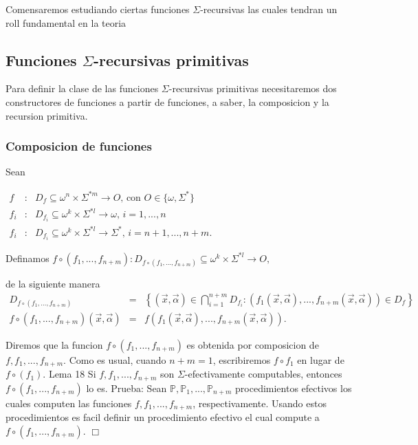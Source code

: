 Comensaremos estudiando ciertas funciones \(\Sigma \)-recursivas las cuales tendran un roll fundamental en la teoria

\subsection{Funciones \(\Sigma \)-recursivas primitivas}

Para definir la clase de las funciones \(\Sigma \)-recursivas primitivas necesitaremos dos constructores de funciones a partir de funciones, a saber, la composicion y la recursion primitiva.

\subsubsection{Composicion de funciones}

Sean

\(\displaystyle \begin{array}{rcl} f & :& D_{f}\subseteq \omega ^{n}\times \Sigma ^{\ast m}\rightarrow O\text{, con }O\in \{\omega ,\Sigma ^{\ast }\} \\ f_{i} & :& D_{f_{i}}\subseteq \omega ^{k}\times \Sigma ^{\ast l}\rightarrow \omega \text{, }i=1,...,n \\ f_{i} & :& D_{f_{i}}\subseteq \omega ^{k}\times \Sigma ^{\ast l}\rightarrow \Sigma ^{\ast }\text{, }i=n+1,...,n+m. \end{array} \)

Definamos
\(\displaystyle f\circ (f_{1},...,f_{n+m}):D_{f\circ (f_{1},...,f_{n+m})}\subseteq \omega ^{k}\times \Sigma ^{\ast l}\rightarrow O, \)

de la siguiente manera
\(\displaystyle \begin{array}{rcl} D_{f\circ (f_{1},...,f_{n+m})} & =& \left\{ (\vec{x},\vec{\alpha})\in \bigcap_{i=1}^{n+m}D_{f_{i}}:(f_{1}(\vec{x},\vec{\alpha}),...,f_{n+m}(\vec{x} ,\vec{\alpha}))\in D_{f}\right\} \\ f\circ (f_{1},...,f_{n+m})(\vec{x},\vec{\alpha}) & =& f(f_{1}(\vec{x},\vec{ \alpha}),...,f_{n+m}(\vec{x},\vec{\alpha})). \end{array} \)

Diremos que la funcion \(f\circ (f_{1},...,f_{n+m})\) es obtenida por composicion de \(f,f_{1},...,f_{n+m}.\) Como es usual, cuando \(n+m=1\), escribiremos \(f\circ f_{1}\) en lugar de \(f\circ (f_{1})\).
Lema 18 Si \(f,f_{1},...,f_{n+m}\) son \(\Sigma \)-efectivamente computables, entonces \( f\circ (f_{1},...,f_{n+m})\) lo es.
Prueba: Sean \(\mathbb{P},\mathbb{P}_{1},...,\mathbb{P}_{n+m}\) procedimientos efectivos los cuales computen las funciones \(f,f_{1},...,f_{n+m}\), respectivamente. Usando estos procedimientos es facil definir un procedimiento efectivo el cual compute a \(f\circ (f_{1},...,f_{n+m})\). \(\Box\)

